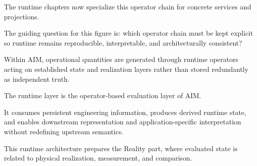 \noindent
The runtime chapters now specialize this operator chain for concrete
services and projections.

The guiding question for this figure is: which operator chain must be
kept explicit so runtime remains reproducible, interpretable, and
architecturally consistent?

\begin{principle}
\label{princ:runtime-layer}
Within AIM, operational quantities are generated through runtime
operators acting on established state and realization layers rather than
stored redundantly as independent truth.
\end{principle}

\begin{summary}
The runtime layer is the operator-based evaluation layer of AIM.

It consumes persistent engineering information, produces derived runtime
state, and enables downstream representation and
application-specific interpretation without redefining upstream
semantics.
\end{summary}

This runtime architecture prepares the Reality part, where evaluated
state is related to physical realization, measurement, and comparison.
